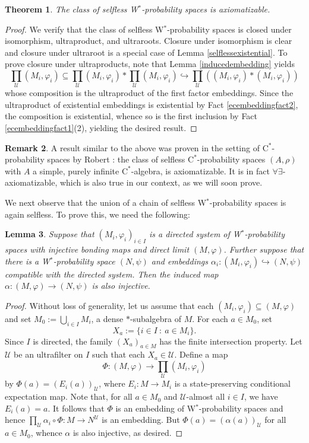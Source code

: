 \documentclass[12pt]{amsart}
\newtheorem{thm}{Theorem}[section]
\newtheorem{lem}[thm]{Lemma}
\theoremstyle{definition}
\newtheorem{remark}[thm]{Remark}
\def\u{\mathsf 1}
\newcommand{\cstar}{$\mathrm{C}^*$}
\def \u{\mathcal U}
\begin{document}
\begin{thm}\label{selflessaxiomatizable}
The class of selfless W$^*$-probability spaces is axiomatizable.
\end{thm}

\begin{proof}
We verify that the class of selfless W$^*$-probability spaces is closed under isomorphism, ultraproduct, and ultraroots.  Closure under isomorphism is clear and closure under ultraroot is a special case of Lemma \ref{selflessexistential}.  To prove closure under ultraproducts, note that Lemma \ref{inducedembedding} yields
$$\prod_\u (M_i,\varphi_i)\subseteq \prod_\u (M_i,\varphi_i)*\prod_\u (M_i,\varphi_i)\hookrightarrow \prod_\u ((M_i,\varphi_i)*(M_i,\varphi_i))$$
whose composition is the ultraproduct of the first factor embeddings.  Since the ultraproduct of existential embeddings is existential by Fact \ref{ecembeddingfact2}, the composition is existential, whence so is the first inclusion by Fact \ref{ecembeddingfact1}(2), yielding the desired result.
\end{proof}

\begin{remark}
A result similar to the above was proven in the setting of \cstar-probability spaces by Robert \cite[Theorem 4.5]{robert2025selfless}:  the class of selfless \cstar-probability spaces $(A,\rho)$ with $A$ a simple, purely infinite \cstar-algebra, is axiomatizable.  It is in fact $\forall\exists$-axiomatizable, which is also true in our context, as we will soon prove.
\end{remark}

We next observe that the union of a chain of selfless W$^*$-probability spaces is again selfless.  To prove this, we need the following:

\begin{lem}\label{injectivelemma}
Suppose that $(M_i,\varphi_i)_{i\in I}$ is a directed system of W$^*$-probability spaces with injective bonding maps and direct limit $(M,\varphi)$.  Further suppose that there is a W$^*$-probability space $(N,\psi)$ and embeddings $\alpha_i:(M_i,\varphi_i)\hookrightarrow (N,\psi)$ compatible with the directed system.  Then the induced map $\alpha:(M,\varphi)\to (N,\psi)$ is also injective.
\end{lem}

\begin{proof}
Without loss of generality, let us assume that each $(M_i,\varphi_i)\subseteq (M,\varphi)$ and set $M_0:=\bigcup_{i\in I}M_i$, a dense $*$-subalgebra of $M$.  For each $a\in M_0$, set $$X_a:=\{i\in I \ : \ a\in M_i\}.$$  Since $I$ is directed, the family $(X_a)_{a\in M}$ has the finite intersection property.  Let $\u$ be an ultrafilter on $I$ such that each $X_a\in \u$.  Define a map $$\Phi:(M,\varphi)\to \prod_\u (M_i,\varphi_i)$$ by $\Phi(a)=(E_i(a))_\u$, where $E_i:M\to M_i$ is a state-preserving conditional expectation map.  Note that, for all $a\in M_0$ and $\u$-almost all $i\in I$, we have $E_i(a)=a$.  It follows that $\Phi$ is an embedding of W$^*$-probability spaces and hence $\prod_\u \alpha_i\circ \Phi:M\to N^\u$ is an embedding.  But $\Phi(a)=(\alpha(a))_\u$ for all $a\in M_0$, whence $\alpha$ is also injective, as desired.
\end{proof}
\end{document}

